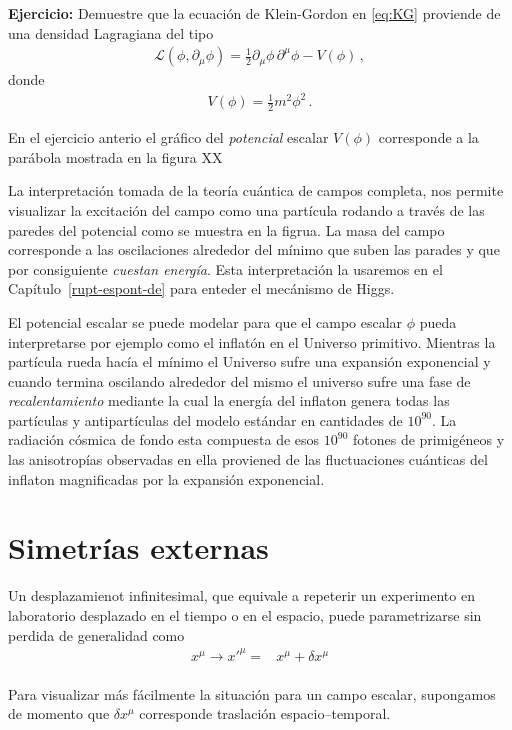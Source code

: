 \textbf{Ejercicio:} Demuestre que la ecuación de Klein-Gordon en \eqref{eq:KG} proviende de una densidad Lagragiana del tipo
\begin{align}
  \mathcal{L}(\phi,\partial_{\mu} \phi)=  \frac{1}{2}{\partial_\mu\phi}\,{\partial^\mu\phi}-V(\phi)\,,
\end{align}
donde
\begin{align}
  V(\phi)=\frac{1}{2}m^2 \phi^2\,.
\end{align}

En el ejercicio anterio el gráfico del \emph{potencial} escalar $V(\phi)$ corresponde a la parábola mostrada en la figura XX

La interpretación tomada de la teoría cuántica de campos completa, nos permite visualizar la excitación del campo como una partícula rodando a través de las paredes del potencial como se muestra en la figrua. La masa del campo corresponde a las oscilaciones alrededor del mínimo que suben las parades y que por consiguiente \emph{cuestan energía}. Esta interpretación la usaremos en el Capítulo~\ref{rupt-espont-de} para enteder el mecánismo de Higgs.

El potencial escalar se puede modelar para que el campo escalar $\phi$ pueda interpretarse por ejemplo como el inflatón en el Universo primitivo. Mientras la partícula rueda hacía el mínimo el Universo sufre una expansión exponencial y cuando termina oscilando alrededor del mismo el universo sufre una fase de \emph{recalentamiento} mediante la cual la energía del inflaton genera todas las partículas y antipartículas del modelo estándar en cantidades de $10^{90}$. La radiación cósmica de fondo esta compuesta de esos $10^{90}$ fotones de primigéneos y las anisotropías observadas en ella proviened de las fluctuaciones cuánticas del inflaton magnificadas por la expansión exponencial.

\section{Simetrías externas}
Un desplazamienot infinitesimal, que equivale a repeterir un experimento en laboratorio desplazado en el tiempo o en el espacio,
puede parametrizarse sin perdida de generalidad como
\begin{align}
  x^\mu\to{x'}^\mu=&x^\mu+\delta x^{\mu}\nonumber\\
\end{align}

Para visualizar más fácilmente la situación para un campo escalar, supongamos de momento que $\delta x^{\mu}$ corresponde  traslaci\'on espacio--temporal.

